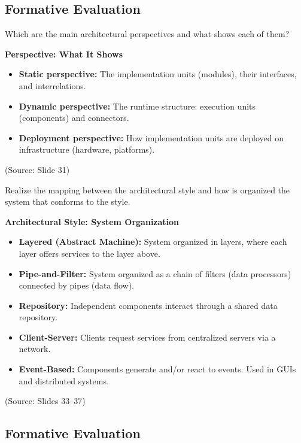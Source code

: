 \documentclass[12pt]{article}
\begin{document}
\subsection{Formative Evaluation}

\begin{questionbox}
Which are the main architectural perspectives and what shows each of them?
\end{questionbox}

\textbf{Perspective: What It Shows}
\begin{itemize}
    \item \textbf{Static perspective:} The implementation units (modules), their interfaces, and interrelations.
    \item \textbf{Dynamic perspective:} The runtime structure: execution units (components) and connectors.
    \item \textbf{Deployment perspective:} How implementation units are deployed on infrastructure (hardware, platforms).
\end{itemize}

(Source: Slide 31)

\begin{questionbox}
Realize the mapping between the architectural style and how is organized the system that conforms to the style.
\end{questionbox}

\textbf{Architectural Style: System Organization}
\begin{itemize}
    \item \textbf{Layered (Abstract Machine):} System organized in layers, where each layer offers services to the layer above.
    \item \textbf{Pipe-and-Filter:} System organized as a chain of filters (data processors) connected by pipes (data flow).
    \item \textbf{Repository:} Independent components interact through a shared data repository.
    \item \textbf{Client-Server:} Clients request services from centralized servers via a network.
    \item \textbf{Event-Based:} Components generate and/or react to events. Used in GUIs and distributed systems.
\end{itemize}

(Source: Slides 33--37)

\subsection{Formative Evaluation}
\end{document}
